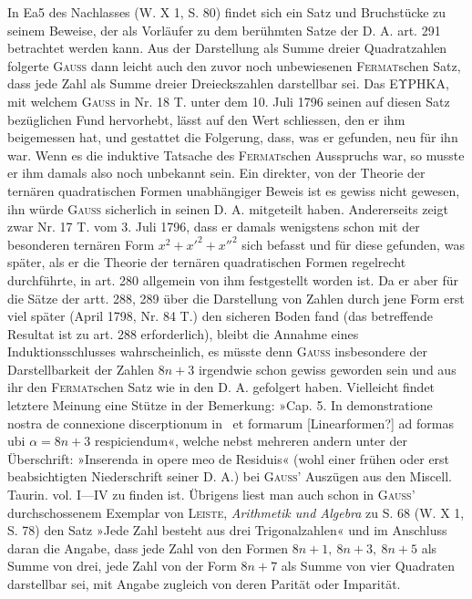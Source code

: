In Ea5 des Nachlasses (W. X 1, S. 80) findet sich ein Satz und Bruchstücke zu seinem Beweise, der als Vorläufer zu dem berühmten Satze der D. A. art. 291 betrachtet werden kann. Aus der Darstellung als Summe dreier Quadratzahlen folgerte \textsc{Gauss} dann leicht auch den zuvor noch unbewiesenen \textsc{Fermat}schen Satz, dass jede Zahl als Summe dreier Dreieckszahlen darstellbar sei. Das {ΕΥΡΗΚΑ}, mit welchem \textsc{Gauss} in Nr. 18 T. unter dem 10. Juli 1796 seinen auf diesen Satz bezüglichen Fund hervorhebt, lässt auf den Wert schliessen, den er ihm beigemessen hat, und gestattet die Folgerung, dass, was er gefunden, neu für ihn war. Wenn es die induktive Tatsache des \textsc{Fermat}schen Ausspruchs war, so musste er ihm damals also noch unbekannt sein. Ein direkter, von der Theorie der ternären quadratischen Formen unabhängiger Beweis ist es gewiss nicht gewesen, ihn würde \textsc{Gauss} sicherlich in seinen D. A. mitgeteilt haben. Andererseits zeigt zwar Nr. 17 T. vom 3. Juli 1796, dass er damals wenigstens schon mit der besonderen ternären Form \(x^2+x'^2+x''^2\) sich befasst und für diese gefunden, was später, als er
\newpage{}
\noindent die Theorie der ternären quadratischen Formen regelrecht durchführte, in art. 280 allgemein von ihm festgestellt worden ist. Da er aber für die Sätze der artt. 288, 289 über die Darstellung von Zahlen durch jene Form erst viel später (April 1798, Nr. 84 T.) den sicheren Boden fand (das betreffende Resultat ist zu art. 288 erforderlich), bleibt die Annahme eines Induktionsschlusses wahrscheinlich, es müsste denn \textsc{Gauss} insbesondere der Darstellbarkeit der Zahlen \(8n+3\) irgendwie schon gewiss geworden sein und aus ihr den \textsc{Fermat}schen Satz wie in den D. A. gefolgert haben. Vielleicht findet letztere Meinung eine Stütze in der Bemerkung: »Cap. 5. In demonstratione nostra de connexione discerptionum in \ThreeHollowSquares\ et formarum [Linearformen?] ad formas ubi \(\alpha=8n+3\) respiciendum«, welche nebst mehreren andern unter der Überschrift: »Inserenda in opere meo de Residuis« (wohl einer frühen oder erst beabsichtigten Niederschrift seiner D. A.) bei \textsc{Gauss}’ Auszügen aus den Miscell. Taurin. vol. I—IV zu finden ist. Übrigens liest man auch schon in \textsc{Gauss}’ durchschossenem Exemplar von \textsc{Leiste}, \textit{Arithmetik und Algebra} zu S. 68 (W. X 1, S. 78) den Satz »Jede Zahl besteht aus drei Trigonalzahlen« und im Anschluss daran die Angabe, dass jede Zahl von den Formen \(8n+1,\ 8n+3,\ 8n+5\) als Summe von drei, jede Zahl von der Form \(8n+7\) als Summe von vier Quadraten darstellbar sei, mit Angabe zugleich von deren Parität oder Imparität.

